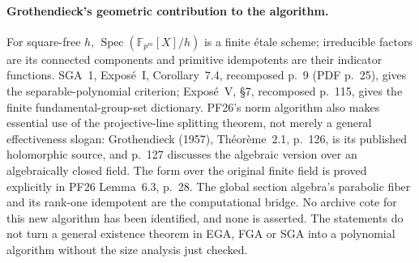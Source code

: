 \paragraph{Grothendieck's geometric contribution to the algorithm.}
For square-free $h$, $\operatorname{Spec}(\mathbb F_{p^m}[X]/h)$
is a finite \mbox{\'etale} scheme; irreducible factors are its connected
components and primitive idempotents are their indicator functions.
SGA~1, Expos\'e~I, Corollary~7.4, recomposed p.~9 (PDF p.~25),
gives the separable-polynomial criterion; Expos\'e~V, \S7,
recomposed p.~115, gives the finite fundamental-group-set dictionary.
PF26's norm algorithm also makes essential use of the projective-line
splitting theorem, not merely a general effectiveness slogan:
Grothendieck (1957), Th\'eor\`eme~2.1, p.~126, is its published
holomorphic source, and p.~127 discusses the algebraic version over
an algebraically closed field. The form over the original finite
field is proved explicitly in PF26 Lemma~6.3, p.~28. The global
section algebra's parabolic fiber and its rank-one idempotent are
the computational bridge. No archive cote for this new algorithm
has been identified, and none is asserted. The statements do not
turn a general existence theorem in EGA, FGA or SGA into a polynomial
algorithm without the size analysis just checked.
